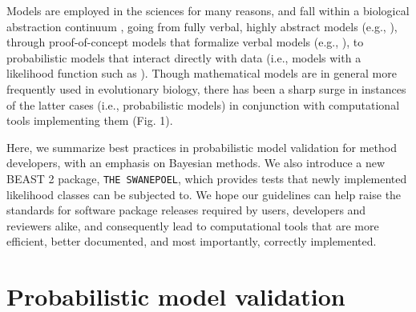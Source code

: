 \documentclass[oneside,twocolumn]{article}
\begin{document}
Models are employed in the sciences for many reasons, and fall within
a biological abstraction continuum \citep{servedio14}, going from
fully verbal, highly abstract models (e.g., \citealt{vanvalen73}), through proof-of-concept models
that formalize verbal models (e.g., \citealt{maynard78,reinhold99,mendes18}), to probabilistic models that interact
directly with data (i.e., models with a likelihood function such as \citealt{yule24,felsenstein73,hky,hudson90}).
Though mathematical models are in general more frequently used in
evolutionary biology, there has been a sharp surge in instances of the
latter cases (i.e., probabilistic models) in conjunction with computational tools implementing them
(Fig. 1).

\vspace{.5cm}


Here, we summarize best practices in probabilistic  model validation for method
developers, with an emphasis on Bayesian methods.
We also introduce a new BEAST 2 package, \texttt{THE SWANEPOEL}, which
provides tests that newly implemented likelihood classes can
be subjected to.
We hope our guidelines can help raise the standards for software
package releases required by users, developers and reviewers alike,
and consequently lead to computational tools that are more efficient, better documented, and most
importantly, correctly implemented.



\section*{Probabilistic model validation}
\end{document}
